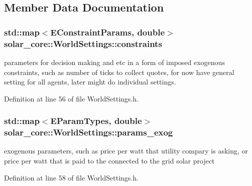\subsection{Member Data Documentation}
\hypertarget{classsolar__core_1_1_world_settings_ab9108a4169d6508f8e03f0298088ac69}{}
\subsubsection[{constraints}]{\setlength{\rightskip}{0pt plus 5cm}std\+::map$<${\bf E\+Constraint\+Params}, double$>$ solar\+\_\+core\+::\+World\+Settings\+::constraints}\label{classsolar__core_1_1_world_settings_ab9108a4169d6508f8e03f0298088ac69}
parameters for decision making and etc in a form of imposed exogenous constraints, such as number of ticks to collect quotes, for now have general setting for all agents, later might do individual settings. 

Definition at line 56 of file World\+Settings.\+h.

\hypertarget{classsolar__core_1_1_world_settings_a2bf0de816c9c0b51e01e88b8ff0f779e}{}
\subsubsection[{params\+\_\+exog}]{\setlength{\rightskip}{0pt plus 5cm}std\+::map$<${\bf E\+Param\+Types}, double$>$ solar\+\_\+core\+::\+World\+Settings\+::params\+\_\+exog}\label{classsolar__core_1_1_world_settings_a2bf0de816c9c0b51e01e88b8ff0f779e}
exogenous parameters, such as price per watt that utility compary is asking, or price per watt that is paid to the connected to the grid solar project 

Definition at line 58 of file World\+Settings.\+h.

\hypertarget{classsolar__core_1_1_world_settings_a728f0b1c11f8ec1816d269aedc1cd80e}{}
